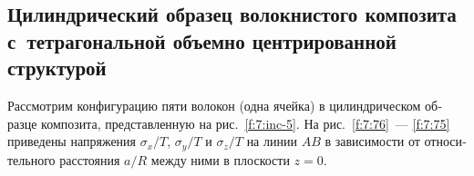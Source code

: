 \begin{russian}
%

\subsection{Цилиндрический образец волокнистого композита с~тетрагональной объемно центрированной структурой}

Рассмотрим конфигурацию пяти волокон (одна ячейка) в цилиндрическом образце композита, представленную на рис.~\ref{f:7:inc-5}. На рис.~\ref{f:7:76}~--- \ref{f:7:75} приведены напряжения $\sigma_x/T$, $\sigma_y/T$ и $\sigma_z/T$ на линии $AB$ в зависимости от относительного расстояния $a/R$ между ними в плоскости $z=0$.


\end{russian}
